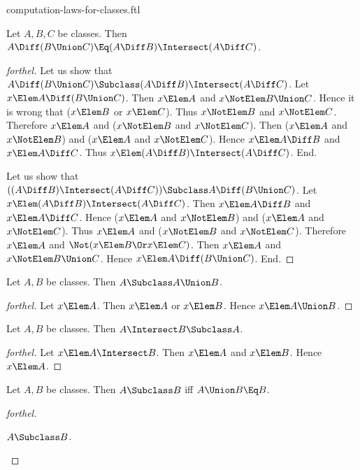 \documentclass{stex}
\begin{document}
\begin{smodule}{computation-laws-for-classes.ftl}
\begin{proposition*}[forthel]
  Let $A, B, C$ be classes.
  Then $A \Diff (B \Union C) \Eq (A \Diff B) \Intersect (A \Diff C)$.
\end{proposition*}
\begin{proof}[forthel]
  Let us show that $A \Diff (B \Union C) \Subclass (A \Diff B) \Intersect (A \Diff C)$.
    Let $x \Elem A \Diff (B \Union C)$.
    Then $x \Elem A$ and $x \NotElem B \Union C$.
    Hence it is wrong that ($x \Elem B$ or $x \Elem C$).
    Thus $x \NotElem B$ and $x \NotElem C$.
    Therefore $x \Elem A$ and ($x \NotElem B$ and $x \NotElem C$).
    Then ($x \Elem A$ and $x \NotElem B$) and ($x \Elem A$ and $x \NotElem C$).
    Hence $x \Elem A \Diff B$ and $x \Elem A \Diff C$.
    Thus $x \Elem (A \Diff B) \Intersect (A \Diff C)$.
  End.

  Let us show that $((A \Diff B) \Intersect (A \Diff C)) \Subclass A \Diff (B \Union C)$. %
    Let $x \Elem (A \Diff B) \Intersect (A \Diff C)$.
    Then $x \Elem A \Diff B$ and $x \Elem A \Diff C$.
    Hence ($x \Elem A$ and $x \NotElem B$) and ($x \Elem A$ and $x \NotElem C$).
    Thus $x \Elem A$ and ($x \NotElem B$ and $x \NotElem C$).
    Therefore $x \Elem A$ and $\Not(x \Elem B \Or x \Elem C)$.
    Then $x \Elem A$ and $x \NotElem B \Union C$.
    Hence $x \Elem A \Diff (B \Union C)$.
  End.
\end{proof}

\begin{proposition*}[forthel]
  Let $A, B$ be classes.
  Then $A \Subclass A \Union B$.
\end{proposition*}
\begin{proof}[forthel]
  Let $x \Elem A$.
  Then $x \Elem A$ or $x \Elem B$.
  Hence $x \Elem A \Union B$.
\end{proof}

\begin{proposition*}[forthel]
  Let $A, B$ be classes.
  Then $A \Intersect B \Subclass A$.
\end{proposition*}
\begin{proof}[forthel]
  Let $x \Elem A \Intersect B$.
  Then $x \Elem A$ and $x \Elem B$.
  Hence $x \Elem A$.
\end{proof}

\begin{proposition*}[forthel]
  Let $A, B$ be classes.
  Then $A \Subclass B$ iff $A \Union B \Eq B$.
\end{proposition*}
\begin{proof}[forthel]
  \begin{case}{$A \Subclass B$.}


\end{case}
\end{proof}
\end{smodule}
\end{document}
